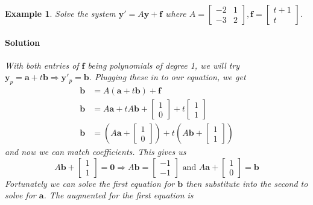 \documentclass[letterpaper, 11pt, openany]{book}
\theoremstyle{mytheoremstyle}
\theoremstyle{myexamplestyle}
\newtheorem{example}{Example}[section]
\newenvironment{solution}{\paragraph{\sffamily \smaller \fontseries{b}\selectfont Solution}}{\hfill\faSquare}
\begin{document}
\begin{example}
    Solve the system \(\mathbf{y}' =A\mathbf{y} + \mathbf{f}\) where \(A = \begin{bmatrix}
        -2 &  1\\ -3 & 2
    \end{bmatrix},\mathbf{f} = \begin{bmatrix}t + 1 \\ t\end{bmatrix}\).
    \begin{solution}
        With both entries of \(\mathbf{f}\) being polynomials of degree 1, we will try \(\mathbf{y}_{p} = \mathbf{a} + t \mathbf{b} \Rightarrow \mathbf{y}'_{p} = \mathbf{b}\).  Plugging these in to our equation, we get
        \begin{align*}
            \mathbf{b} &= A(\mathbf{a} + t \mathbf{b}) + \mathbf{f}\\
            \mathbf{b} &= A \mathbf{a} + t A \mathbf{b} + \begin{bmatrix}1 \\ 0\end{bmatrix} + t \begin{bmatrix}1 \\ 1 \end{bmatrix}\\
            \mathbf{b} &= \left(A \mathbf{a} + \begin{bmatrix}1 \\ 0\end{bmatrix}\right) + t\left(A \mathbf{b} + \begin{bmatrix}1 \\ 1 \end{bmatrix}\right)
        \end{align*}
        and now we can match coefficients. This gives us
        \[A \mathbf{b} + \begin{bmatrix}1 \\ 1 \end{bmatrix} = \mathbf{0} \Rightarrow A \mathbf{b} = \begin{bmatrix}-1 \\ -1\end{bmatrix} \text{ and } A \mathbf{a} + \begin{bmatrix}1 \\ 0\end{bmatrix} = \mathbf{b}\]
        Fortunately we can solve the first equation for \(\mathbf{b}\) then substitute into the second to solve for \(\mathbf{a}\). The augmented for the first equation is

\end{solution}
\end{example}
\end{document}
